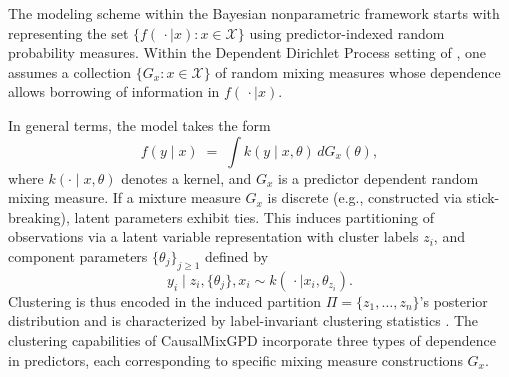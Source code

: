 \documentclass[11pt]{article}\usepackage[]{graphicx}\usepackage[]{xcolor}
\newcommand{\pkg}[1]{\textsf{#1}}
\begin{document}
The modeling scheme within the Bayesian nonparametric framework starts with representing the set $\{f(\,\cdot\mid x): x\in\mathcal{X}\}$ using predictor-indexed random probability measures. Within the Dependent Dirichlet Process setting of \citet{MacEachern1999,MacEachern2000}, one assumes a collection $\{G_x: x\in\mathcal{X}\}$ of random mixing measures whose dependence allows borrowing of information in $f(\,\cdot\mid x)$.

In general terms, the model takes the form
\begin{equation*}
f(y\mid x) \;=\; \int k\!\left(y\mid x,\theta\right)\, dG_x(\theta),
\end{equation*}
where $k(\cdot\mid x,\theta)$ denotes a kernel, and $G_x$ is a predictor dependent random mixing measure. If a mixture measure $G_x$ is discrete (e.g., constructed via stick-breaking), latent parameters exhibit ties. This induces partitioning of observations via a latent variable representation with cluster labels $z_i$, and component parameters $\{\theta_j\}_{j\ge1}$ defined by
\begin{equation*}
y_i \mid z_i,\{\theta_j\},x_i \sim k\!\left(\,\cdot \mid x_i,\theta_{z_i}\right).
\end{equation*}
Clustering is thus encoded in the induced partition $\Pi=\{z_1,\ldots,z_n\}$'s posterior distribution and is characterized by label-invariant clustering statistics \citep{Binder1978,Dahl2006}. The clustering capabilities of \pkg{CausalMixGPD} incorporate three types of dependence in predictors, each corresponding to specific mixing measure constructions $G_x$.
\end{document}
